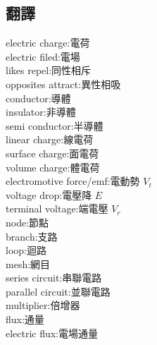 \documentclass[a4paper,10pt,twocolumn,oneside]{article}
\begin{document}
\begin{normalsize}
\section{翻譯}
electric charge:電荷 \\
electric filed:電場 \\
likes repel:同性相斥 \\
opposites attract:異性相吸 \\
conductor:導體 \\
insulator:非導體 \\
semi conductor:半導體 \\
linear charge:線電荷 \\
surface charge:面電荷 \\
volume charge:體電荷 \\
electromotive force/emf:電動勢  $ V_{t} $\\
voltage drop:電壓降 $E$\\
terminal voltage:端電壓 $ V_{r} $\\ 
node:節點 \\
branch:支路 \\
loop:迴路 \\
mesh:網目 \\
series circuit:串聯電路 \\
parallel circuit:並聯電路 \\
multiplier:倍增器 \\
flux:通量 \\
electric flux:電場通量\\
\end{normalsize}
\end{document}
